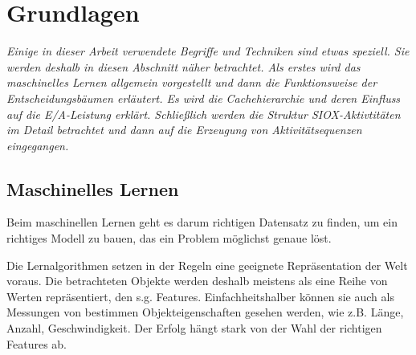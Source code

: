 
\newpage

\section{Grundlagen}
\textit{Einige in dieser Arbeit verwendete Begriffe und Techniken sind etwas speziell.
Sie werden deshalb in diesen Abschnitt näher betrachtet.
Als erstes wird das maschinelles Lernen allgemein vorgestellt und dann die Funktionsweise der Entscheidungsbäumen erläutert. 
Es wird die Cachehierarchie und deren Einfluss auf die E/A-Leistung erklärt.
Schließlich werden die Struktur SIOX-Aktivtitäten im Detail betrachtet und dann auf die Erzeugung von Aktivitätsequenzen eingegangen.
}




\subsection{Maschinelles Lernen}

Beim maschinellen Lernen geht es darum richtigen Datensatz zu finden, um ein richtiges Modell zu bauen, das ein Problem möglichst genaue löst.

Die Lernalgorithmen setzen in der Regeln eine geeignete Repräsentation der Welt voraus.
Die betrachteten Objekte werden deshalb meistens als eine Reihe von Werten repräsentiert, den s.g. Features.
Einfachheitshalber können sie auch als Messungen von bestimmen Objekteigenschaften gesehen werden, wie z.B. Länge, Anzahl, Geschwindigkeit.
Der Erfolg hängt stark von der Wahl der richtigen Features ab.

